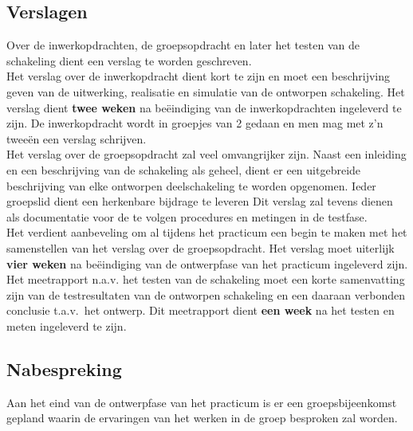 \subsection{Verslagen}
Over de inwerkopdrachten, de groepsopdracht en later het testen van
de schakeling dient een verslag te worden geschreven.  \\
Het verslag over de inwerkopdracht dient kort te zijn en moet een
beschrijving geven van de uitwerking, realisatie en simulatie van de
ontworpen schakeling. Het verslag dient {\bf twee weken} na be\"eindiging van de
inwerkopdrachten ingeleverd te zijn.
De inwerkopdracht wordt in groepjes van 2 gedaan en men mag 
met z'n twee\"en een verslag schrijven. \\
Het verslag over de groepsopdracht zal veel omvangrijker zijn.
Naast een inleiding en een beschrijving van de schakeling als geheel, 
dient er een uitgebreide beschrijving van elke ontworpen deelschakeling 
te worden opgenomen. 
Ieder groepslid dient een herkenbare bijdrage te leveren
Dit verslag zal tevens dienen als documentatie voor de te
volgen procedures en metingen in de testfase. \\
Het verdient aanbeveling om al tijdens het practicum een begin te
maken met het samenstellen van het verslag over de groepsopdracht. 
Het verslag moet uiterlijk {\bf vier weken} na be\"eindiging van de ontwerpfase van het
practicum ingeleverd zijn.\\
Het meetrapport n.a.v. het testen van de schakeling moet een korte samenvatting 
zijn van de testresultaten
van de ontworpen schakeling en een daaraan verbonden conclusie
t.a.v.\ het ontwerp.
Dit meetrapport dient {\bf een week} na het testen en meten
ingeleverd te zijn.
\subsection{Nabespreking}
Aan het eind van de ontwerpfase van het practicum is er een
groepsbijeenkomst gepland waarin de ervaringen van het werken in de
groep besproken zal worden. 

\cleardoublepage
